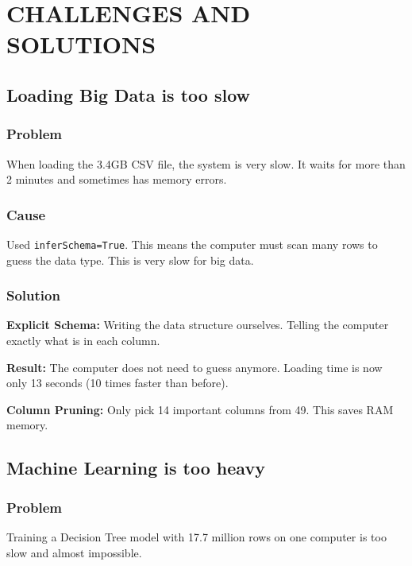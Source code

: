 \documentclass[12pt,a4paper]{report}
\begin{document}
\chapter{CHALLENGES AND SOLUTIONS}

\section{Loading Big Data is too slow}

\subsection{Problem}

When loading the 3.4GB CSV file, the system is very slow. It waits for more than 2 minutes and sometimes has memory errors.

\subsection{Cause}

Used \texttt{inferSchema=True}. This means the computer must scan many rows to guess the data type. This is very slow for big data.

\subsection{Solution}

\noindent\textbf{Explicit Schema:} Writing the data structure ourselves. Telling the computer exactly what is in each column.

\noindent\textbf{Result:} The computer does not need to guess anymore. Loading time is now only 13 seconds (10 times faster than before).

\noindent\textbf{Column Pruning:} Only pick 14 important columns from 49. This saves RAM memory.

\section{Machine Learning is too heavy}

\subsection{Problem}

Training a Decision Tree model with 17.7 million rows on one computer is too slow and almost impossible.
\end{document}
